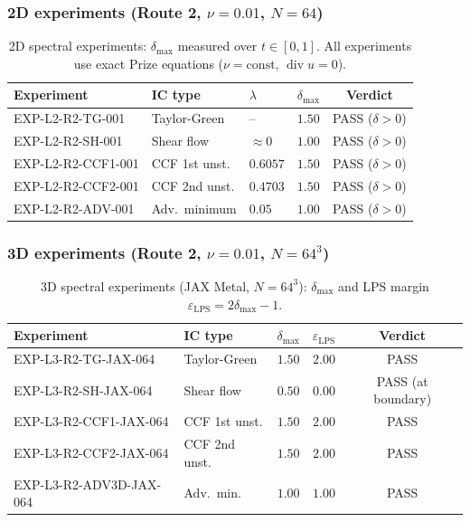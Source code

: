 \documentclass[12pt]{article}
\theoremstyle{plain}
\theoremstyle{definition}
\theoremstyle{remark}
\newcommand{\eps}{\varepsilon}
\newcommand{\Div}{\operatorname{div}}
\newcommand{\LPS}{\text{LPS}}
\begin{document}
\subsubsection*{2D experiments (Route 2, $\nu=0.01$, $N=64$)}

\begin{table}[h]
\centering
\caption{2D spectral experiments: $\delta_{\max}$ measured over $t\in[0,1]$.
All experiments use exact Prize equations ($\nu=\mathrm{const}$, $\Div u=0$).}
\label{tab:2d-results}
\begin{tabular}{lllcc}
\toprule
Experiment & IC type & $\lambda$ & $\delta_{\max}$ & Verdict\\
\midrule
EXP-L2-R2-TG-001    & Taylor-Green   & --     & $1.50$ & PASS ($\delta>0$) \\
EXP-L2-R2-SH-001    & Shear flow     & $\approx 0$ & $1.00$ & PASS ($\delta>0$) \\
EXP-L2-R2-CCF1-001  & CCF 1st unst.  & $0.6057$ & $1.50$ & PASS ($\delta>0$) \\
EXP-L2-R2-CCF2-001  & CCF 2nd unst.  & $0.4703$ & $1.50$ & PASS ($\delta>0$) \\
EXP-L2-R2-ADV-001   & Adv.\ minimum  & $0.05$   & $1.00$ & PASS ($\delta>0$) \\
\bottomrule
\end{tabular}
\end{table}

\subsubsection*{3D experiments (Route 2, $\nu=0.01$, $N=64^3$)}

\begin{table}[h]
\centering
\caption{3D spectral experiments (JAX Metal, $N=64^3$):
$\delta_{\max}$ and LPS margin $\eps_{\LPS}=2\delta_{\max}-1$.}
\label{tab:3d-results}
\begin{tabular}{llccc}
\toprule
Experiment & IC type & $\delta_{\max}$ & $\eps_{\LPS}$ & Verdict\\
\midrule
EXP-L3-R2-TG-JAX-064    & Taylor-Green     & $1.50$ & $2.00$ & PASS \\
EXP-L3-R2-SH-JAX-064    & Shear flow       & $0.50$ & $0.00$ & PASS (at boundary)\\
EXP-L3-R2-CCF1-JAX-064  & CCF 1st unst.    & $1.50$ & $2.00$ & PASS \\
EXP-L3-R2-CCF2-JAX-064  & CCF 2nd unst.    & $1.50$ & $2.00$ & PASS \\
EXP-L3-R2-ADV3D-JAX-064 & Adv.\ min.       & $1.00$ & $1.00$ & PASS \\
\bottomrule
\end{tabular}
\end{table}
\end{document}
